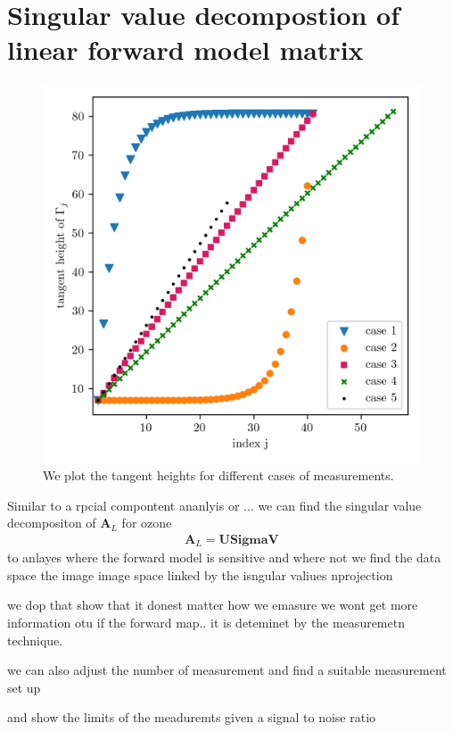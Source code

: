 \section{Singular value decompostion of linear forward model matrix}
\begin{figure}[ht!]
	\centering
	\includegraphics{MeasTangHeight.png}
	\caption[Tangent heights for different sequence of measurements.]{We plot the tangent heights for different cases of measurements.}
	\label{fig:TangHCases}
\end{figure}

Similar to a rpcial compontent ananlyis or ... we can find the singular value decompositon of $\bm{A}_L$ for ozone
\begin{align}
	\bm{A}_L = \bm{U} \bm{Sigma} \bm{V}
\end{align}
to anlayes where the forward model is sensitive and where not
we find the data space the image image space
linked by the isngular valiues nprojection

we dop that show that it donest matter how we emasure we wont get more information otu if the forward map.. it is deteminet by the measuremetn technique.

we can also adjust the number of measurement and find a suitable measurement set up


and show the limits of the meaduremts given a signal to noise ratio


